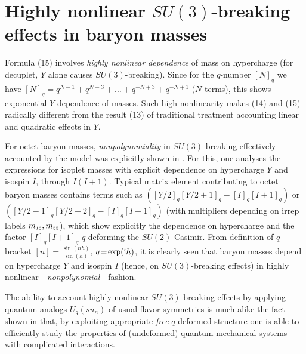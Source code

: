 \documentclass[twoside]{article}
\newcommand{\scr}{\rm\scriptscriptstyle}
\begin{document}
\section{Highly nonlinear $SU(3)$-breaking effects in baryon masses}
Formula (15) involves {\it highly nonlinear dependence} of mass on
hypercharge (for decuplet, $Y$ alone causes $SU(3)$-breaking).
Since for the $q$-number $[N]_q$ we have
$[N]_q=q^{N-1}+q^{N-3}+\ldots +q^{-N+3}+q^{-N+1}$ ($N$ terms),
this shows exponential $Y$-dependence of masses. Such
high nonlinearity makes (14) and (15) radically different from
the result (13) of traditional treatment accounting linear and
quadratic effects in $Y$.

For octet baryon masses, {\em nonpolynomiality}
in $SU(3)$-breaking effectively accounted by the model was
explicitly shown in     \cite{ga-io}.
For this, one analyses the expressions for isoplet
masses with explicit dependence on hypercharge $Y$ and isospin $I$,
through $I(I+1)$.  Typical matrix element contributing to
octet baryon masses contains terms such as
$\left({[Y/2]_q[Y/2\!+\!1]_q-[I]_q[I\!+\!1]_q}\right)$  or
$\left({[Y/2-1]_q[Y/2-2]_q-[I]_q[I+1]_q}\right)$  (with multipliers
depending on irrep labels $m_{\scr{15}},m_{\scr{55}}$), which show
explicitly the dependence on hypercharge and the factor
$[I]_q[I+1]_q$ $q$-deforming the $SU(2)$ Casimir.  From definition
of $q$-bracket $[n]=\frac{\sin(nh)}{\sin(h)}$, $ q\!=\!\exp({\rm i}h)$,
it is clearly seen that baryon masses depend on hypercharge $Y$ and
isospin $I$ (hence, on $SU(3)$-breaking effects) in
highly nonlinear - {\it nonpolynomial} - fashion.

The ability to account highly nonlinear
$SU(3)$-breaking effects by applying
quantum analogs $U_q(su_n)$ of usual flavor symmetries
is much alike the fact shown in    \cite{lor-we} that,
by exploiting appropriate {\em free} $q$-deformed
structure one is able to efficiently study the properties of
(undeformed) quantum-mechanical systems with complicated
interactions.
\end{document}
